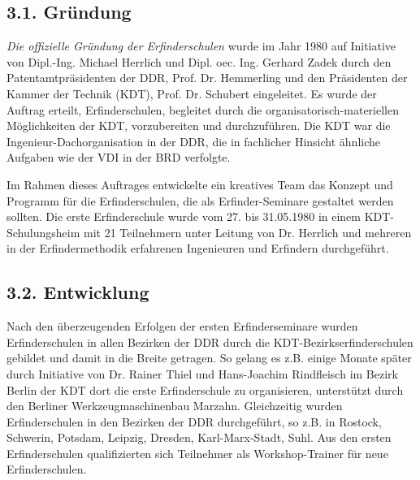 \documentclass[11pt,a4paper]{article}
\begin{document}
\subsection*{3.1. Gründung}
\emph{Die offizielle Gründung der Erfinderschulen} wurde im Jahr 1980 auf
Initiative von Dipl.-Ing. Michael Herrlich und Dipl. oec. Ing. Gerhard Zadek
durch den Patentamtpräsidenten der DDR, Prof. Dr. Hemmerling und den
Präsidenten der Kammer der Technik (KDT), Prof. Dr. Schubert eingeleitet. Es
wurde der Auftrag erteilt, Erfinderschulen, begleitet durch die
organisatorisch-materiellen Möglichkeiten der KDT, vorzubereiten und
durchzuführen. Die KDT war die Ingenieur-Dachorganisation in der DDR, die in
fachlicher Hinsicht ähnliche Aufgaben wie der VDI in der BRD verfolgte.

Im Rahmen dieses Auftrages entwickelte ein kreatives Team das Konzept und
Programm für die Erfinderschulen, die als Erfinder-Seminare gestaltet werden
sollten. Die erste Erfinderschule wurde vom 27. bis 31.05.1980 in einem
KDT-Schulungsheim mit 21 Teilnehmern unter Leitung von Dr. Herrlich und
mehreren in der Erfindermethodik erfahrenen Ingenieuren und Erfindern
durchgeführt.

\subsection*{3.2. Entwicklung}
Nach den überzeugenden Erfolgen der ersten Erfinderseminare wurden
Erfinderschulen in allen Bezirken der DDR durch die KDT-Bezirkserfinderschulen
gebildet und damit in die Breite getragen. So gelang es z.B. einige Monate
später durch Initiative von Dr. Rainer Thiel und Hans-Joachim Rindfleisch im
Bezirk Berlin der KDT dort die erste Erfinderschule zu organisieren,
unterstützt durch den Berliner Werkzeugmaschinenbau Marzahn. Gleichzeitig
wurden Erfinderschulen in den Bezirken der DDR durchgeführt, so z.B. in
Rostock, Schwerin, Potsdam, Leipzig, Dresden, Karl-Marx-Stadt, Suhl. Aus den
ersten Erfinderschulen qualifizierten sich Teilnehmer als Workshop-Trainer für
neue Erfinderschulen.
\end{document}
